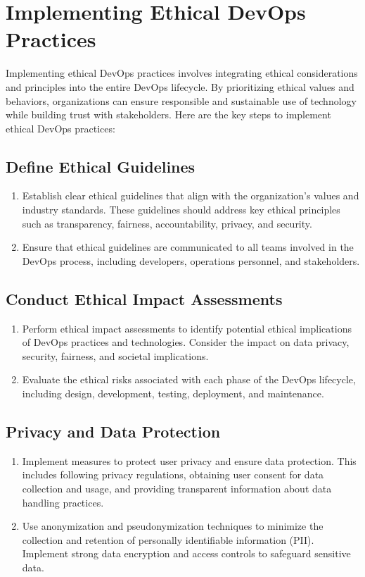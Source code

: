\chapter{Implementing Ethical DevOps Practices}

Implementing ethical DevOps practices involves integrating ethical considerations and principles into the entire DevOps lifecycle. By prioritizing ethical values and behaviors, organizations can ensure responsible and sustainable use of technology while building trust with stakeholders. Here are the key steps to implement ethical DevOps practices:

\section*{Define Ethical Guidelines}
\begin{enumerate}
    \item Establish clear ethical guidelines that align with the organization's values and industry standards. These guidelines should address key ethical principles such as transparency, fairness, accountability, privacy, and security.

    \item Ensure that ethical guidelines are communicated to all teams involved in the DevOps process, including developers, operations personnel, and stakeholders.
\end{enumerate}

\section*{Conduct Ethical Impact Assessments}
\begin{enumerate}
    \item Perform ethical impact assessments to identify potential ethical implications of DevOps practices and technologies. Consider the impact on data privacy, security, fairness, and societal implications.

    \item Evaluate the ethical risks associated with each phase of the DevOps lifecycle, including design, development, testing, deployment, and maintenance.
\end{enumerate}

\section*{Privacy and Data Protection}
\begin{enumerate}
    \item Implement measures to protect user privacy and ensure data protection. This includes following privacy regulations, obtaining user consent for data collection and usage, and providing transparent information about data handling practices.

    \item Use anonymization and pseudonymization techniques to minimize the collection and retention of personally identifiable information (PII). Implement strong data encryption and access controls to safeguard sensitive data.
\end{enumerate}

